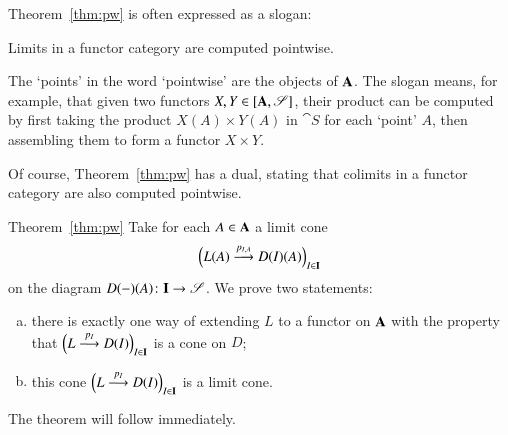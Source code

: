 Theorem~\ref{thm:pw} is often expressed as a slogan:
%
\begin{slogan}
Limits in a functor category are computed pointwise.%
%
%
%
\end{slogan}
%
The `points' in the word `pointwise' are the objects of $\mathbf{A}$.  The
slogan means, for example, that given two functors $X, Y \in
[\mathbf{A},\mathscr{S}]$, their product can be computed by first taking
the product $X(A) \times Y(A)$ in $\cat{S}$ for each `point' $A$, then
assembling them to form a functor $X \times Y$.

Of course, Theorem~\ref{thm:pw} has a dual, stating that colimits in a
functor category are also computed pointwise.

\begin{pfof}{Theorem~\ref{thm:pw}}
Take for each $A \in \mathbf{A}$ a limit cone
%
\begin{equation}
\label{eq:pw-cone}
\Bigl( L(A) \stackrel{p_{I, A}}{\longrightarrow} D(I)(A) \Bigr)_{I \in \mathbf{I}}
\end{equation}
%
on the diagram $D(\dashbk)(A)\from \scat{I} \to \cat{S}$.  We prove two
statements:
%
\begin{enumerate}[(b)]
\item
\label{item:pw-lift}
there is exactly one way of extending $L$ to a functor on $\mathbf{A}$ with
the property that $\Bigl(L \stackrel{p_I}{\longrightarrow} D(I)\Bigr)_{I \in \mathbf{I}}$ is a
cone on $D$;

\item
\label{item:pw-lim}
this cone $\Bigl(L \stackrel{p_I}{\longrightarrow} D(I)\Bigr)_{I \in \mathbf{I}}$ is a limit cone.
\end{enumerate}
%
The theorem will follow immediately.


\end{pfof}
